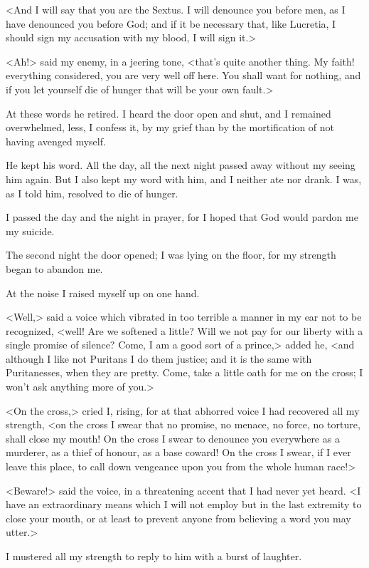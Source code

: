 {<And I will say that you are the Sextus. I will denounce you before men, as I have denounced you before God; and if it be necessary that, like Lucretia, I should sign my accusation with my blood, I will sign it.>

<Ah!> said my enemy, in a jeering tone, <that's quite another thing. My faith! everything considered, you are very well off here. You shall want for nothing, and if you let yourself die of hunger that will be your own fault.> 

At these words he retired. I heard the door open and shut, and I remained overwhelmed, less, I confess it, by my grief than by the mortification of not having avenged myself. 

He kept his word. All the day, all the next night passed away without my seeing him again. But I also kept my word with him, and I neither ate nor drank. I was, as I told him, resolved to die of hunger. 

I passed the day and the night in prayer, for I hoped that God would pardon me my suicide. 

The second night the door opened; I was lying on the floor, for my strength began to abandon me. 

At the noise I raised myself up on one hand. 

<Well,> said a voice which vibrated in too terrible a manner in my ear not to be recognized, <well! Are we softened a little? Will we not pay for our liberty with a single promise of silence? Come, I am a good sort of a prince,> added he, <and although I like not Puritans I do them justice; and it is the same with Puritanesses, when they are pretty. Come, take a little oath for me on the cross; I won't ask anything more of you.> 

<On the cross,> cried I, rising, for at that abhorred voice I had recovered all my strength, <on the cross I swear that no promise, no menace, no force, no torture, shall close my mouth! On the cross I swear to denounce you everywhere as a murderer, as a thief of honour, as a base coward! On the cross I swear, if I ever leave this place, to call down vengeance upon you from the whole human race!> 

<Beware!> said the voice, in a threatening accent that I had never yet heard. <I have an extraordinary means which I will not employ but in the last extremity to close your mouth, or at least to prevent anyone from believing a word you may utter.> 

I mustered all my strength to reply to him with a burst of laughter. 

}
